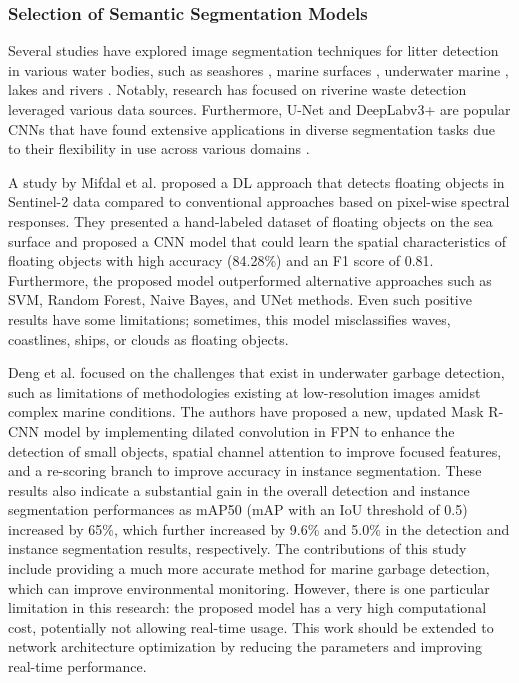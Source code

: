 \documentclass{ieeeaccess}
\begin{document}
\subsubsection{Selection of Semantic Segmentation Models}
\label{sec:IS_selection}
Several studies have explored image segmentation techniques for litter detection in various water bodies, such as seashores \cite{Kylili2021ANP} \cite{Kako2020EstimationOP}, marine surfaces \cite{mifdal-isprs-annals-V-3-2021-285-2021}, underwater marine \cite{Deng2021AnEA}, lakes \cite{Jakovljevic2020ADL} and rivers \cite{Tharani2021TrashDO, Jakovljevic2020ADL, Gmez2022ALA, ShijunPAN2024}. Notably, research has focused on riverine waste detection leveraged various data sources. Furthermore, U-Net \cite{Ronneberger2015UNetCN} and DeepLabv3+ \cite{Chen2018EncoderDecoderWA} are popular CNNs that have found extensive applications in diverse segmentation tasks due to their flexibility in use across various domains \cite{Hadinata2023MulticlassSO}. 

A study by Mifdal et al. \cite{mifdal-isprs-annals-V-3-2021-285-2021} proposed a DL approach that detects floating objects in Sentinel-2 data compared to conventional approaches based on pixel-wise spectral responses. They presented a hand-labeled dataset of floating objects on the sea surface and proposed a CNN model that could learn the spatial characteristics of floating objects with high accuracy (84.28\%) and an F1 score of 0.81. Furthermore, the proposed model outperformed alternative approaches such as SVM, Random Forest, Naive Bayes, and UNet methods. Even such positive results have some limitations; sometimes, this model misclassifies waves, coastlines, ships, or clouds as floating objects.

Deng et al.\cite{Deng2021AnEA} focused on the challenges that exist in underwater garbage detection, such as limitations of methodologies existing at low-resolution images amidst complex marine conditions. The authors have proposed a new, updated Mask R-CNN model by implementing dilated convolution in FPN to enhance the detection of small objects, spatial channel attention to improve focused features, and a re-scoring branch to improve accuracy in instance segmentation. These results also indicate a substantial gain in the overall detection and instance segmentation performances as mAP50 (mAP with an IoU threshold of 0.5) increased by 65\%, which further increased by 9.6\% and 5.0\% in the detection and instance segmentation results, respectively. The contributions of this study include providing a much more accurate method for marine garbage detection, which can improve environmental monitoring. However, there is one particular limitation in this research: the proposed model has a very high computational cost, potentially not allowing real-time usage. This work should be extended to network architecture optimization by reducing the parameters and improving real-time performance.
\end{document}
